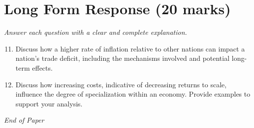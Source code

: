 \documentclass[12pt]{article}
\begin{document}
\section*{Long Form Response (20 marks)}
\textit{Answer each question with a clear and complete explanation.}
\begin{enumerate}[label=\arabic*.]
\setcounter{enumi}{10}
\item Discuss how a higher rate of inflation relative to other nations can impact a nation's trade deficit, including the mechanisms involved and potential long-term effects.
\item Discuss how increasing costs, indicative of decreasing returns to scale, influence the degree of specialization within an economy. Provide examples to support your analysis.
\end{enumerate}

\vfill
\noindent\textit{End of Paper}
\end{document}

